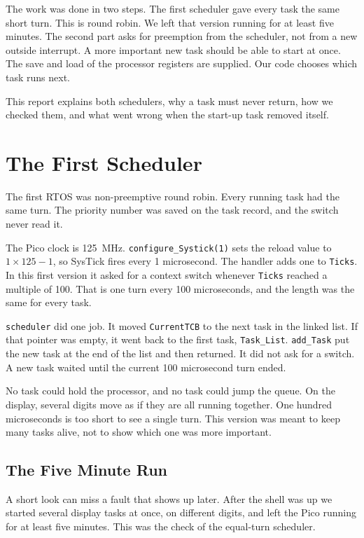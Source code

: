 \documentclass[conference,a4paper]{IEEEtran}
\begin{document}
The work was done in two steps. The first scheduler gave every task the same short turn. This is round robin. We left that version running for at least five minutes. The second part asks for preemption from the scheduler, not from a new outside interrupt. A more important new task should be able to start at once. The save and load of the processor registers are supplied. Our code chooses which task runs next.

This report explains both schedulers, why a task must never return, how we checked them, and what went wrong when the start-up task removed itself.

\section{The First Scheduler}

The first RTOS was non-preemptive round robin. Every running task had the same turn. The priority number was saved on the task record, and the switch never read it.

The Pico clock is 125~MHz. \texttt{configure\_Systick(1)} sets the reload value to \(1 \times 125 - 1\), so SysTick fires every 1 microsecond. The handler adds one to \texttt{Ticks}. In this first version it asked for a context switch whenever \texttt{Ticks} reached a multiple of 100. That is one turn every 100 microseconds, and the length was the same for every task.

\texttt{scheduler} did one job. It moved \texttt{CurrentTCB} to the next task in the linked list. If that pointer was empty, it went back to the first task, \texttt{Task\_List}. \texttt{add\_Task} put the new task at the end of the list and then returned. It did not ask for a switch. A new task waited until the current 100 microsecond turn ended.

No task could hold the processor, and no task could jump the queue. On the display, several digits move as if they are all running together. One hundred microseconds is too short to see a single turn. This version was meant to keep many tasks alive, not to show which one was more important.

\subsection{The Five Minute Run}
\label{sec:testwait}

A short look can miss a fault that shows up later. After the shell was up we started several display tasks at once, on different digits, and left the Pico running for at least five minutes. This was the check of the equal-turn scheduler.
\end{document}

